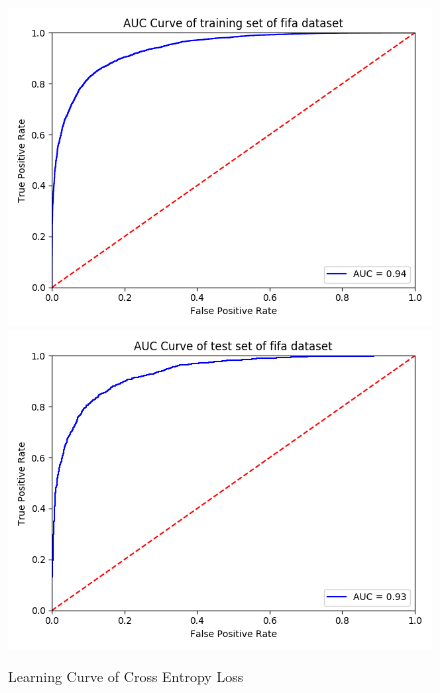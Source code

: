 \documentclass{article}
\begin{document}
\begin{figure}[h]
  \centering
  \includegraphics[scale=0.3]{fifa_auc_train.png}
  \includegraphics[scale=0.3]{fifa_auc_test.png}
  \caption{Learning Curve of Cross Entropy Loss}
\end{figure}

\FloatBarrier
\end{document}
